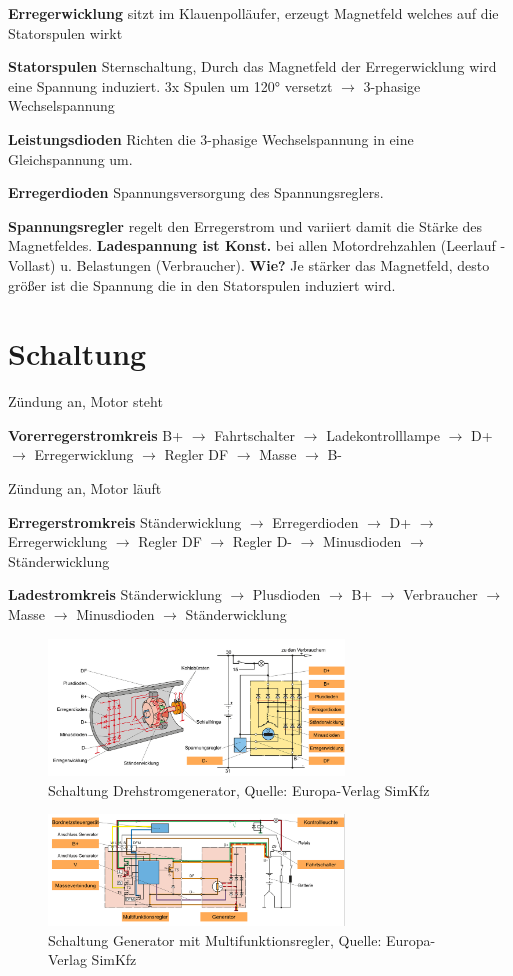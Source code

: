 \textbf{Erregerwicklung} sitzt im Klauenpolläufer, erzeugt Magnetfeld
welches auf die Statorspulen wirkt

\textbf{Statorspulen} Sternschaltung, Durch das Magnetfeld der
Erregerwicklung wird eine Spannung induziert. 3x Spulen um 120° versetzt
$\to$ 3-phasige Wechselspannung

\textbf{Leistungsdioden} Richten die 3-phasige Wechselspannung in eine
Gleichspannung um.

\textbf{Erregerdioden} Spannungsversorgung des Spannungsreglers.

\textbf{Spannungsregler} regelt den Erregerstrom und variiert damit die
Stärke des Magnetfeldes. \textbf{Ladespannung ist Konst.} bei allen
Motordrehzahlen (Leerlauf - Vollast) u. Belastungen (Verbraucher).
\textbf{Wie?} Je stärker das Magnetfeld, desto größer ist die Spannung
die in den Statorspulen induziert wird.

\newpage

\section{Schaltung}\label{schaltung}

Zündung an, Motor steht

\textbf{Vorerregerstromkreis} B+ $\to$ Fahrtschalter $\to$
Ladekontrolllampe $\to$ D+ $\to$ Erregerwicklung $\to$ Regler DF
$\to$ Masse $\to$ B-

Zündung an, Motor läuft

\textbf{Erregerstromkreis} Ständerwicklung $\to$ Erregerdioden $\to$
D+ $\to$ Erregerwicklung $\to$ Regler DF $\to$ Regler D- $\to$
Minusdioden $\to$ Ständerwicklung

\textbf{Ladestromkreis} Ständerwicklung $\to$ Plusdioden $\to$ B+
$\to$ Verbraucher $\to$ Masse $\to$ Minusdioden $\to$
Ständerwicklung

\begin{figure}[!ht]%
\centering
\includegraphics[width=0.7\textwidth]{images/Generator/Drehstromgenerator.png}
\caption{Schaltung Drehstromgenerator, Quelle: Europa-Verlag SimKfz}
\end{figure}

\begin{figure}[!ht]%
\centering
\includegraphics[width=0.7\textwidth]{images/Generator/Generator-Multifunktionsregler.png}
\caption{Schaltung Generator mit Multifunktionsregler, Quelle:
Europa-Verlag SimKfz}
\end{figure}
